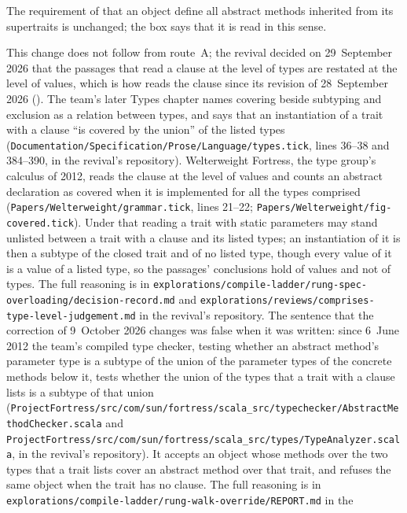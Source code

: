 \begin{description}
The requirement of  that an object define all abstract
methods inherited from its supertraits is unchanged; the box says that it is
read in this sense.
\item[Rationale] This change does not follow from route~A; the revival decided
on 29~September 2026 that the passages that read a  clause at the
level of types are restated at the level of values, which is how
 reads the clause since its revision of 28~September 2026
().
The team's later Types chapter names covering beside subtyping and exclusion as
a relation between types, and says that an instantiation of a trait with a
 clause ``is covered by the union'' of the listed types
(\nolinkurl{Documentation/Specification/Prose/Language/types.tick}, lines 36--38
and 384--390, in the revival's repository).
Welterweight Fortress, the type group's calculus of 2012, reads the clause at
the level of values and counts an abstract declaration as covered when it is
implemented for all the types comprised
(\nolinkurl{Papers/Welterweight/grammar.tick}, lines 21--22;
\nolinkurl{Papers/Welterweight/fig-covered.tick}).
Under that reading a trait with static parameters may stand unlisted between a
trait with a  clause and its listed types; an instantiation of it
is then a subtype of the closed trait and of no listed type, though every value
of it is a value of a listed type, so the passages' conclusions hold of values
and not of types.
The full reasoning is in
\nolinkurl{explorations/compile-ladder/rung-spec-overloading/decision-record.md}
and \nolinkurl{explorations/reviews/comprises-type-level-judgement.md} in the
revival's repository.
The sentence that the correction of 9~October 2026 changes was false when it was
written: since 6~June 2012 the team's compiled type checker, testing whether an
abstract method's parameter type is a subtype of the union of the parameter
types of the concrete methods below it, tests whether the union of the types
that a trait with a  clause lists is a subtype of that union
(\nolinkurl{ProjectFortress/src/com/sun/fortress/scala_src/typechecker/AbstractMethodChecker.scala}
and \nolinkurl{ProjectFortress/src/com/sun/fortress/scala_src/types/TypeAnalyzer.scala},
in the revival's repository).
It accepts an object whose methods over the two types that a trait lists cover
an abstract method over that trait, and refuses the same object when the trait
has no  clause.
The full reasoning is in
\nolinkurl{explorations/compile-ladder/rung-walk-override/REPORT.md} in the

\end{description}

